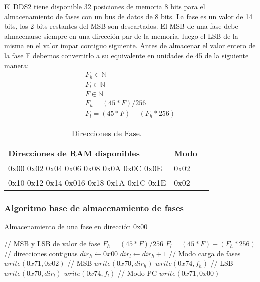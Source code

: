 El DDS2 tiene disponible 32 posiciones de memoria 8 bits para el almacenamiento de fases
con un bus de datos de 8 bits.
La fase es un valor de 14 bits, los 2 bits restantes del MSB son descartados.
El MSB de una fase debe almacenarse siempre en una direcci\'on par de la memoria, luego
el LSB de la misma en el valor impar contiguo siguiente.
Antes de almacenar el valor entero de la fase F debemos convertirlo a su equivalente
en unidades de 45 de la siguiente manera:
\begin{gather}
        F_h \in \mathbb{N} \\
        F_l \in \mathbb{N} \\
        F \in \mathbb{N} \\
        F_h = (45 * F) / 256 \\          
        F_l = (45 * F) - (F_h * 256)
\end{gather}

\begin{table}[ht]
    \centering
    \begin{tabular}{|l|l|l|}
    \hline
    Direcciones de RAM disponibles           & Modo \\
    \hline
    0x00 0x02 0x04 0x06 0x08 0x0A 0x0C 0x0E  & 0x02 \\
    \hline
    0x10 0x12 0x14 0x016 0x18 0x1A 0x1C 0x1E & 0x02 \\
    \hline
\end{tabular}
\caption{\label{tab:tableTestCases}Direcciones de Fase.}
\end{table}

\subsubsection{Algoritmo base de almacenamiento de fases}
\begin{algorithm}[H]
    \caption{Almacenamiento de una fase en direcci\'on 0x00}\label{algo_phases}
    \begin{algorithmic}[1]
    \State // {MSB y LSB de valor de fase}
    \State $F_h = (45 * F) / 256$         
    \State $F_l = (45 * F) - (F_h * 256)$
    \State // {direcciones contiguas}
    \State $dir_h \gets 0x00$
    \State $dir_l \gets dir_h + 1$
    \State // {Modo carga de fases}
    \State $write(0x71, 0x02)$
    \State // {MSB}
    \State $write(0x70, dir_h)$ 
    \State $write(0x74, f_h)$
    \State // {LSB}
    \State $write(0x70, dir_l)$
    \State $write(0x74, f_l)$
    \State // {Modo PC}
    \State $write(0x71, 0x00)$
    \EndProcedure
    \end{algorithmic}
\end{algorithm}

